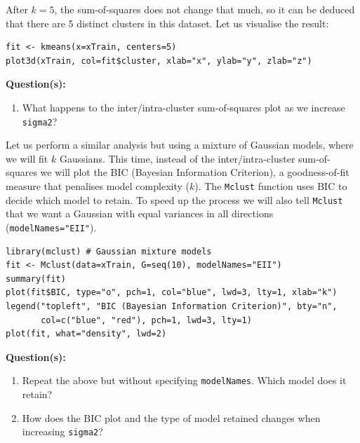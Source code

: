\documentclass[a4paper,11pt]{article}
\begin{document}
After $k=5$, the sum-of-squares does not change that much, so it can be deduced that
there are 5 distinct clusters in this dataset. Let us visualise the result:
\vspace{0.3cm}
\begin{lstlisting}[style=RCode]
fit <- kmeans(x=xTrain, centers=5)
plot3d(xTrain, col=fit$cluster, xlab="x", ylab="y", zlab="z")
\end{lstlisting}

\begin{framed}
\textbf{Question(s):}
\begin{enumerate}
	\item What happens to the inter/intra-cluster sum-of-squares plot as we increase \texttt{sigma2}?
\end{enumerate}
\end{framed}

Let us perform a similar analysis but using a mixture of Gaussian models, where
we will fit $k$ Gaussians. This time, instead of the inter/intra-cluster sum-of-squares
we will plot the BIC (Bayesian Information Criterion), a goodness-of-fit measure that
penalises model complexity ($k$). The \texttt{Mclust} function uses BIC to decide which
model to retain. To speed up the process we will also tell \texttt{Mclust} that we
want a Gaussian with equal variances in all directions (\texttt{modelNames="EII"}). 
\\
\begin{lstlisting}[style=RCode]
library(mclust) # Gaussian mixture models
fit <- Mclust(data=xTrain, G=seq(10), modelNames="EII")
summary(fit)
plot(fit$BIC, type="o", pch=1, col="blue", lwd=3, lty=1, xlab="k")
legend("topleft", "BIC (Bayesian Information Criterion)", bty="n",
       col=c("blue", "red"), pch=1, lwd=3, lty=1)
plot(fit, what="density", lwd=2)
\end{lstlisting}

\begin{framed}
\textbf{Question(s):}
\begin{enumerate}
	\item Repeat the above but without specifying \texttt{modelNames}. Which model does it retain?
	\item How does the BIC plot and the type of model retained changes when increasing \texttt{sigma2}?
\end{enumerate}
\end{framed}

\clearpage
\end{document}
